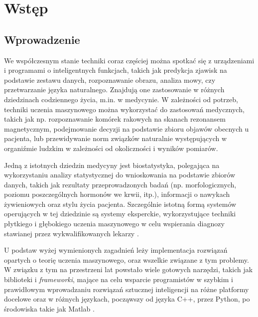 \chapter{Wstęp}
\section{Wprowadzenie} %

We współczesnym stanie techniki coraz częściej można spotkać się z urządzeniami i programami o inteligentnych funkcjach, takich jak predykcja zjawisk na podstawie zestawu danych, rozpoznawanie obrazu, analiza mowy, czy przetwarzanie języka naturalnego. Znajdują one zastosowanie w różnych dziedzinach codziennego życia, m.in. w medycynie. W zależności od potrzeb, techniki uczenia maszynowego można wykorzystać do zastosowań medycznych, takich jak np. rozpoznawanie komórek rakowych na skanach rezonansem magnetycznym, podejmowanie decyzji na podstawie zbioru objawów obecnych u pacjenta, lub przewidywanie norm związków naturalnie występujących w organiźmie ludzkim w zależności od okoliczności i wyników pomiarów. 

Jedną z istotnych dziedzin medycyny jest biostatystyka, polegająca na wykorzystaniu analizy statystycznej do wnioskowania na podstawie zbiorów danych, takich jak rezultaty przeprowadzonych badań (np. morfologicznych, poziomu poszczególnych hormonów we krwii, itp.), informacji o nawykach żywieniowych oraz stylu życia pacjenta. Szczególnie istotną formą systemów operujących w tej dziedzinie są systemy eksperckie, wykorzystujące techniki płytkiego i głębokiego uczenia maszynowego w celu wspierania diagnozy stawianej przez wykwalifikowanych lekarzy \cite{expert}. 

U podstaw wyżej wymienionych zagadnień leży implementacja rozwiązań opartych o teorię uczenia maszynowego, oraz wszelkie związane z tym problemy. W związku z tym na przestrzeni lat powstało wiele gotowych narzędzi, takich jak biblioteki i \textit{frameworki}, mające na celu wsparcie programistów w szybkim i prawidłowym wprowadzaniu rozwiązań sztucznej inteligencji na różne platformy docelowe oraz w różnych językach, począwszy od języka C++, przez Python, po środowiska takie jak Matlab \cite{tf_api}. 

